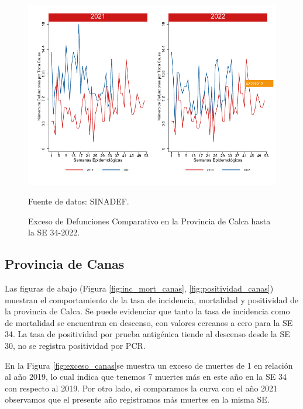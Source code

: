 \documentclass[12pt,a4paper,openany]{book}
\begin{document}
	\begin{figure}[h]
		\caption{Exceso de Defunciones Comparativo en la Provincia de Calca hasta la SE 34-2022.}\label{fig:exceso_calca}
		\begin{center}
			\includegraphics[width=0.7\linewidth]{../figuras/exceso_3.pdf}
		\end{center}
		{\footnotesize {Fuente de datos: SINADEF.}}
	\end{figure}
	
	\clearpage
	
	\subsection*{Provincia de Canas}
	\noindent Las figuras de abajo (Figura \ref{fig:inc_mort_canas}, \ref{fig:positividad_canas}) muestran el comportamiento de la tasa de incidencia, mortalidad y  positividad de  la provincia de Calca. Se puede evidenciar que tanto la tasa de incidencia como de mortalidad se encuentran en descenso, con valores cercanos a cero para la SE 34. La tasa de positividad por prueba antigénica tiende al descenso desde la SE 30, no se registra positividad por PCR.
	
	En la Figura \ref{fig:exceso_canas}se  muestra un exceso de muertes de 1 en relación al año 2019, lo cual indica que tenemos 7 muertes más en este año en la SE 34 con respecto al 2019. Por otro lado, si comparamos la curva con el año 2021 observamos que el presente año registramos más muertes en la misma SE.
	
\end{document}
